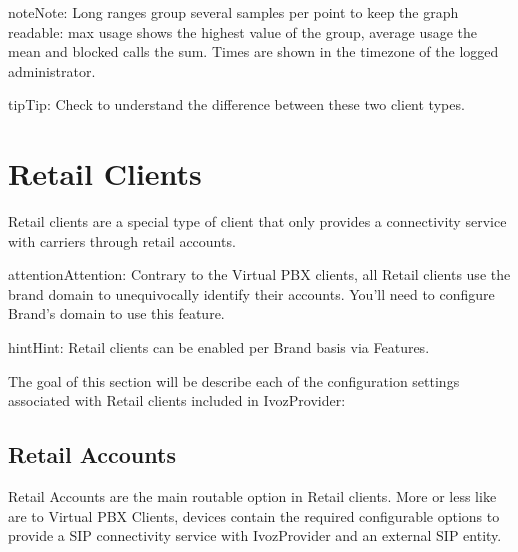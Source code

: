 \documentclass[letterpaper,10pt,english]{sphinxmanual}
\begin{document}
\begin{notice}{note}{Note:}
Long ranges group several samples per point to keep the graph readable: max usage shows the highest value
of the group, average usage the mean and blocked calls the sum. Times are shown in the timezone of the
logged administrator.
\end{notice}

\begin{notice}{tip}{Tip:}
Check {\hyperref[administration_portal/brand/clients/retail:differences\string-between\string-retail\string-and\string-residential\string-clients]{}} to understand the difference between these two
client types.
\end{notice}
\label{administration_portal/client/retail/index:retail-clients}

\section{Retail Clients}
\label{administration_portal/client/retail/index:retail-clients}\label{administration_portal/client/retail/index:clientes-retail}\label{administration_portal/client/retail/index::doc}\label{administration_portal/client/retail/index:id1}
Retail clients are a special type of client that only provides a connectivity
service with carriers through retail accounts.

\begin{notice}{attention}{Attention:}
Contrary to the Virtual PBX clients, all Retail clients use the
brand domain to unequivocally identify their accounts. You'll need to configure
Brand's domain to use this feature.
\end{notice}

\begin{notice}{hint}{Hint:}
Retail clients can be enabled per Brand basis via Features.
\end{notice}

The goal of this section will be describe each of the configuration settings
associated with Retail clients included in IvozProvider:


\subsection{Retail Accounts}
\label{administration_portal/client/retail/retail_accounts::doc}\label{administration_portal/client/retail/retail_accounts:retail-accounts}\label{administration_portal/client/retail/retail_accounts:id1}
Retail Accounts are the main routable option in Retail clients.
More or less like {\hyperref[administration_portal/client/vpbx/routing_endpoints/friends/index:friends]{}} are to Virtual PBX Clients, devices
contain the required configurable options to provide a SIP connectivity
service with IvozProvider and an external SIP entity.
\end{document}

